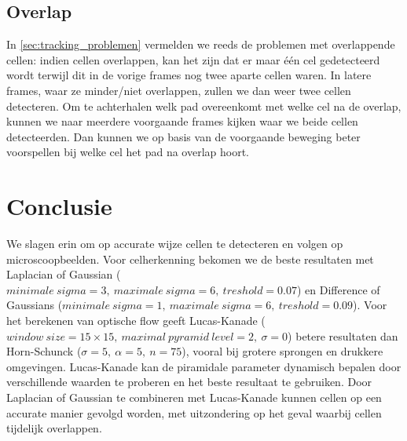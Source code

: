 \documentclass{article}
\begin{document}
\begin{multicols}{2}
\subsection{Overlap}
In \autoref{sec:tracking_problemen} vermelden we reeds de problemen met overlappende cellen: indien cellen overlappen, kan het zijn dat er maar één cel gedetecteerd wordt terwijl dit in de vorige frames nog twee aparte cellen waren. In latere frames, waar ze minder/niet overlappen, zullen we dan weer twee cellen detecteren. Om te achterhalen welk pad overeenkomt met welke cel na de overlap, kunnen we naar meerdere voorgaande frames kijken waar we beide cellen detecteerden. Dan kunnen we op basis van de voorgaande beweging beter voorspellen bij welke cel het pad na overlap hoort.
\section{Conclusie}
We slagen erin om op accurate wijze cellen te detecteren en volgen op microscoopbeelden. Voor celherkenning bekomen we de beste resultaten met Laplacian of Gaussian ($minimale\ sigma = 3,\ maximale\ sigma = 6,\ treshold = 0.07$) en Difference of Gaussians ($minimale\ sigma = 1,\ maximale\ sigma = 6,\ treshold = 0.09$). Voor het berekenen van optische flow geeft Lucas-Kanade ($window\ size = 15\times15,\ maximal\ pyramid\ level = 2,\ \sigma = 0$) betere resultaten dan Horn-Schunck ($\sigma = 5,\ \alpha = 5,\ n = 75$), vooral bij grotere sprongen en drukkere omgevingen. Lucas-Kanade kan de piramidale parameter dynamisch bepalen door verschillende waarden te proberen en het beste resultaat te gebruiken. Door Laplacian of Gaussian te combineren met Lucas-Kanade kunnen cellen op een accurate manier gevolgd worden, met uitzondering op het geval waarbij cellen tijdelijk overlappen.

\nocite{*} %
\printbibliography
\end{multicols}
\end{document}
